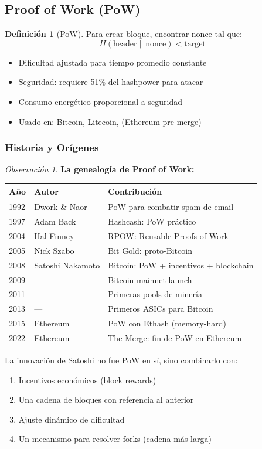 \documentclass[11pt,a4paper,twoside,openright]{book}
\theoremstyle{definition}
\newtheorem{definition}{Definición}[chapter]
\theoremstyle{plain}
\theoremstyle{remark}
\newtheorem{remark}{Observación}[chapter]
\begin{document}
\subsection{Proof of Work (PoW)}

\begin{definition}[PoW]
Para crear bloque, encontrar nonce tal que:
\[
H(\text{header} \| \text{nonce}) < \text{target}
\]
\end{definition}

\begin{itemize}
    \item Dificultad ajustada para tiempo promedio constante
    \item Seguridad: requiere 51\% del hashpower para atacar
    \item Consumo energético proporcional a seguridad
    \item Usado en: Bitcoin, Litecoin, (Ethereum pre-merge)
\end{itemize}

\subsubsection{Historia y Orígenes}

\begin{remark}
\textbf{La genealogía de Proof of Work:}

\begin{center}
\begin{tabular}{lll}
\toprule
\textbf{Año} & \textbf{Autor} & \textbf{Contribución} \\
\midrule
1992 & Dwork \& Naor & PoW para combatir spam de email \\
1997 & Adam Back & Hashcash: PoW práctico \\
2004 & Hal Finney & RPOW: Reusable Proofs of Work \\
2005 & Nick Szabo & Bit Gold: proto-Bitcoin \\
2008 & Satoshi Nakamoto & Bitcoin: PoW + incentivos + blockchain \\
2009 & --- & Bitcoin mainnet launch \\
2011 & --- & Primeras pools de minería \\
2013 & --- & Primeros ASICs para Bitcoin \\
2015 & Ethereum & PoW con Ethash (memory-hard) \\
2022 & Ethereum & The Merge: fin de PoW en Ethereum \\
\bottomrule
\end{tabular}
\end{center}

La innovación de Satoshi no fue PoW en sí, sino combinarlo con:
\begin{enumerate}
    \item Incentivos económicos (block rewards)
    \item Una cadena de bloques con referencia al anterior
    \item Ajuste dinámico de dificultad
    \item Un mecanismo para resolver forks (cadena más larga)
\end{enumerate}
\end{remark}
\end{document}
